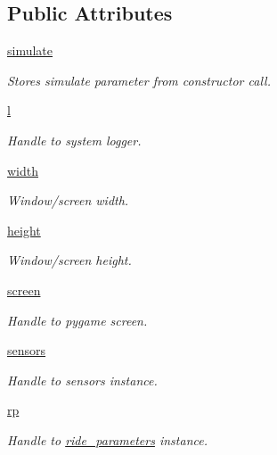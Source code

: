 \subsection*{Public Attributes}
\begin{DoxyCompactItemize}
\item 
\hyperlink{classocc_1_1open__cycling__computer_a9bf952f2299899216b9adf8c382db024}{simulate}
\begin{DoxyCompactList}\small\item\em Stores simulate parameter from constructor call. \end{DoxyCompactList}\item 
\hyperlink{classocc_1_1open__cycling__computer_ae6203e191770e28dde9a508a4d818dba}{l}
\begin{DoxyCompactList}\small\item\em Handle to system logger. \end{DoxyCompactList}\item 
\hyperlink{classocc_1_1open__cycling__computer_a56f3dab67d5bff0740ffbd8654d55582}{width}
\begin{DoxyCompactList}\small\item\em Window/screen width. \end{DoxyCompactList}\item 
\hyperlink{classocc_1_1open__cycling__computer_a2215795145291166265958493e692bab}{height}
\begin{DoxyCompactList}\small\item\em Window/screen height. \end{DoxyCompactList}\item 
\hyperlink{classocc_1_1open__cycling__computer_a6637c748b8ecbacd54bc36c504bfefaa}{screen}
\begin{DoxyCompactList}\small\item\em Handle to pygame screen. \end{DoxyCompactList}\item 
\hyperlink{classocc_1_1open__cycling__computer_a7fb670e84da1971f5b34c5f10e0b0418}{sensors}
\begin{DoxyCompactList}\small\item\em Handle to sensors instance. \end{DoxyCompactList}\item 
\hyperlink{classocc_1_1open__cycling__computer_afb5049a2519476feb5edd4fb6e4b2aea}{rp}
\begin{DoxyCompactList}\small\item\em Handle to \hyperlink{namespaceride__parameters}{ride\+\_\+parameters} instance. \end{DoxyCompactList}\item 

\end{DoxyCompactItemize}
